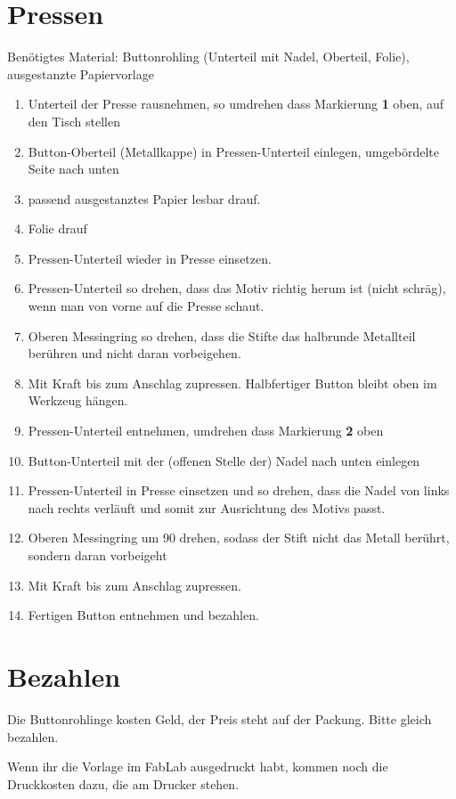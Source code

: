 \documentclass{\basedir/fablab-document}
\begin{document}
\section{Pressen}
Benötigtes Material: Buttonrohling (Unterteil mit Nadel, Oberteil, Folie), ausgestanzte Papiervorlage
\begin{enumerate}
  \item Unterteil der Presse rausnehmen, so umdrehen dass Markierung \textbf{1} oben, auf den Tisch stellen
  \item Button-Oberteil (Metallkappe) in Pressen-Unterteil einlegen, umgebördelte Seite nach unten
  \item passend ausgestanztes Papier lesbar drauf.
  \item Folie drauf
  \item Pressen-Unterteil wieder in Presse einsetzen.
  \item Pressen-Unterteil so drehen, dass das Motiv richtig herum ist (nicht schräg), wenn man von vorne auf die Presse schaut.
  \item Oberen Messingring so drehen, dass die Stifte  das halbrunde Metallteil berühren und nicht daran vorbeigehen.
  \item Mit Kraft bis zum Anschlag zupressen. Halbfertiger Button bleibt oben im Werkzeug hängen.
  \item Pressen-Unterteil entnehmen, umdrehen dass Markierung \textbf{2} oben
  \item Button-Unterteil mit der (offenen Stelle der) Nadel nach unten einlegen
  \item Pressen-Unterteil in Presse einsetzen und so drehen, dass die Nadel von links nach rechts verläuft und somit zur Ausrichtung des Motivs passt.
  \item Oberen Messingring um 90\textdegree{} drehen, sodass der Stift nicht das Metall berührt, sondern daran vorbeigeht
  \item Mit Kraft bis zum Anschlag zupressen.
  \item Fertigen Button entnehmen und bezahlen.
\end{enumerate}

\section{Bezahlen}
Die Buttonrohlinge kosten Geld, der Preis steht auf der Packung. Bitte gleich bezahlen.

Wenn ihr die Vorlage im FabLab ausgedruckt habt, kommen noch die Druckkosten dazu, die am Drucker stehen.
\end{document}
